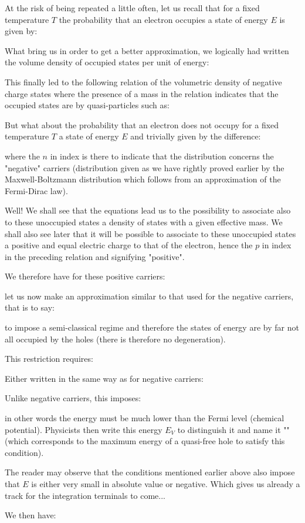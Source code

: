 	At the risk of being repeated a little often, let us recall that for a fixed temperature $T$ the probability that an electron occupies a state of energy $E$ is given by:
	
	What bring us in order to get a better approximation, we logically had written the volume density of occupied states per unit of energy:
	
	This finally led to the following relation of the volumetric density of negative charge states where the presence of a mass in the relation indicates that the occupied states are by quasi-particles such as:
	
	But what about the probability that an electron does not occupy for a fixed temperature $T$ a state of energy $E$ and trivially given by the difference:
	
	where the $n$ in index is there to indicate that the distribution concerns the "negative" carriers (distribution given as we have rightly proved earlier by the Maxwell-Boltzmann distribution which follows from an approximation of the Fermi-Dirac law).
	
	Well! We shall see that the equations lead us to the possibility to associate also to these unoccupied states a density of states with a given effective mass. We shall also see later that it will be possible to associate to these unoccupied states a positive and equal electric charge to that of the electron, hence the $p$ in index in the preceding relation and signifying "positive".

	We therefore have for these positive carriers:
	
	let us now make an approximation similar to that used for the negative carriers, that is to say:
	
	to impose a semi-classical regime and therefore the states of energy are by far not all occupied by the holes (there is therefore no degeneration).

	This restriction requires:
	
	Either written in the same way as for negative carriers:
	
	Unlike negative carriers, this imposes:
	
	in other words the energy must be much lower than the Fermi level (chemical potential). Physicists then write this energy $E_V$ to distinguish it and name it "" (which corresponds to the maximum energy of a quasi-free hole to satisfy this condition).
	\begin{tcolorbox}[title=Remark,colframe=black,arc=10pt]
	The reader may observe that the conditions mentioned earlier above also impose that $E$ is either very small in absolute value or negative. Which gives us already a track for the integration terminals to come...
	\end{tcolorbox}	
	We then have:
	
